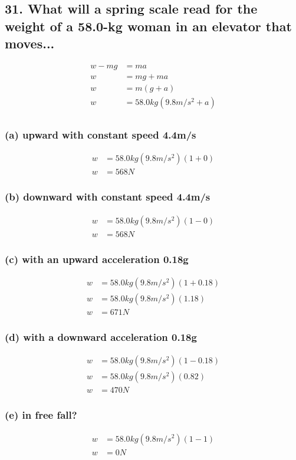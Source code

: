 \documentclass[12pt,a4paper,english]{article}
\begin{document}
\begin{flushleft}
  \subsection{31. What will a spring scale read for the weight of a 58.0-kg woman in an elevator that moves...}
  \begin{align*}
    w-mg&=ma
    \\
    w&=mg+ma
    \\
    w&=m(g+a)
    \\
    w&=58.0kg(9.8m/s^2+a)
    \\
  \end{align*}
  \subsubsection{(a) upward with constant speed 4.4m/s}
  \begin{align*}
    w&=58.0kg(9.8m/s^2)(1+0)
    \\
    w&=568N
  \end{align*}
  \subsubsection{(b) downward with constant speed 4.4m/s}
  \begin{align*}
    w&=58.0kg(9.8m/s^2)(1-0)
    \\
    w&=568N
  \end{align*}
  \subsubsection{(c) with an upward acceleration 0.18g}
  \begin{align*}
    w&=58.0kg(9.8m/s^2)(1+0.18)
    \\
    w&=58.0kg(9.8m/s^2)(1.18)
    \\
    w&=671N
  \end{align*}
  \subsubsection{(d) with a downward acceleration 0.18g}
  \begin{align*}
    w&=58.0kg(9.8m/s^2)(1-0.18)
    \\
    w&=58.0kg(9.8m/s^2)(0.82)
    \\
    w&=470N
  \end{align*}
  \subsubsection{(e) in free fall?}
  \begin{align*}
    w&=58.0kg(9.8m/s^2)(1-1)
    \\
    w&=0N
  \end{align*}

\end{flushleft}
\end{document}
